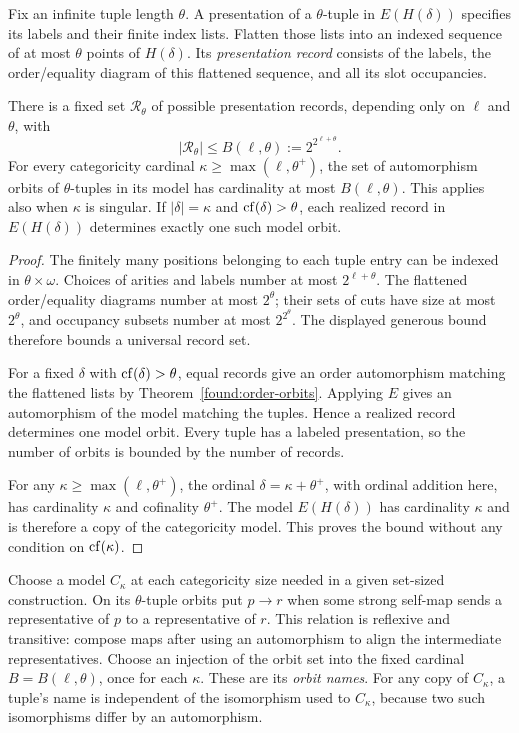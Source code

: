 Fix an infinite tuple length $\theta$. A presentation of a
$\theta$-tuple in $E(H(\delta))$ specifies its labels and their
finite index lists. Flatten those lists into an indexed sequence
of at most $\theta$ points of $H(\delta)$. Its \emph{presentation
record} consists of the labels, the order/equality diagram of
this flattened sequence, and all its slot occupancies.

\begin{lemma}
\label{found:orbit-bound}
There is a fixed set $\mathcal R_\theta$ of possible presentation
records, depending only on $\ell$ and $\theta$, with
\[
|\mathcal R_\theta|\leq B(\ell,\theta):=2^{2^{\ell+\theta}}.
\]
For every categoricity cardinal
$\kappa\geq\max(\ell,\theta^+)$, the set of automorphism orbits of
$\theta$-tuples in its model has cardinality at most
$B(\ell,\theta)$. This applies also when $\kappa$ is singular.
If $|\delta|=\kappa$ and $\operatorname{cf}(\delta)>\theta$, each realized
record in $E(H(\delta))$ determines exactly one such model orbit.
\end{lemma}

\begin{proof}
The finitely many positions belonging to each tuple entry can
be indexed in $\theta\times\omega$. Choices of arities and
labels number at most $2^{\ell+\theta}$. The flattened
order/equality diagrams number at most $2^\theta$; their sets
of cuts have size at most $2^\theta$, and occupancy subsets
number at most $2^{2^\theta}$. The displayed generous bound
therefore bounds a universal record set.

For a fixed $\delta$ with $\operatorname{cf}(\delta)>\theta$, equal records
give an order automorphism matching the flattened lists by
Theorem~\ref{found:order-orbits}. Applying $E$ gives an
automorphism of the model matching the tuples. Hence a
realized record determines one model orbit. Every tuple has
a labeled presentation, so the number of orbits is bounded
by the number of records.

For any $\kappa\geq\max(\ell,\theta^+)$, the ordinal
$\delta=\kappa+\theta^+$, with ordinal addition here, has
cardinality $\kappa$ and cofinality $\theta^+$. The model
$E(H(\delta))$ has cardinality $\kappa$ and is therefore a
copy of the categoricity model. This proves the bound without
any condition on $\operatorname{cf}(\kappa)$.
\end{proof}

Choose a model $C_\kappa$ at each categoricity size needed in a
given set-sized construction. On its $\theta$-tuple orbits put
$p\longrightarrow r$ when some strong self-map sends a
representative of $p$ to a representative of $r$. This relation
is reflexive and transitive: compose maps after using an
automorphism to align the intermediate representatives.
Choose an injection of the orbit set into the fixed cardinal
$B=B(\ell,\theta)$, once for each $\kappa$. These are its
\emph{orbit names}. For any copy of $C_\kappa$, a tuple's
name is independent of the isomorphism used to $C_\kappa$,
because two such isomorphisms differ by an automorphism.

